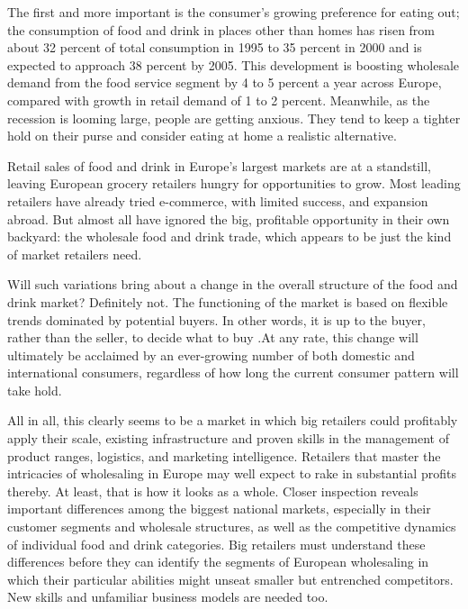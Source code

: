 
\qquad [A] The first and more important is the consumer's growing preference for eating out; the consumption of food and drink in places other than homes has risen from about 32 percent of total consumption in 1995 to 35 percent in 2000 and is expected to approach 38 percent by 2005. This development is boosting wholesale demand from the food service segment by 4 to 5 percent a year across Europe, compared with growth in retail demand of 1 to 2 percent. Meanwhile, as the recession is looming large, people are getting anxious. They tend to keep a tighter hold on their purse and consider eating at home a realistic alternative.

\qquad [B] Retail sales of food and drink in Europe's largest markets are at a standstill, leaving European grocery retailers hungry for opportunities to grow. Most leading retailers have already tried e-commerce, with limited success, and expansion abroad. But almost all have ignored the big, profitable opportunity in their own backyard: the wholesale food and drink trade, which appears to be just the kind of market retailers need.

\qquad [C] Will such variations bring about a change in the overall structure of the food and drink market? Definitely not. The functioning of the market is based on flexible trends dominated by potential buyers. In other words, it is up to the buyer, rather than the seller, to decide what to buy .At any rate, this change will ultimately be acclaimed by an ever-growing number of both domestic and international consumers, regardless of how long the current consumer pattern will take hold.

\qquad [D] All in all, this clearly seems to be a market in which big retailers could profitably apply their scale, existing infrastructure and proven skills in the management of product ranges, logistics, and marketing intelligence. Retailers that master the intricacies of wholesaling in Europe may well expect to rake in substantial profits thereby. At least, that is how it looks as a whole. Closer inspection reveals important differences among the biggest national markets, especially in their customer segments and wholesale structures, as well as the competitive dynamics of individual food and drink categories. Big retailers must understand these differences before they can identify the segments of European wholesaling in which their particular abilities might unseat smaller but entrenched competitors. New skills and unfamiliar business models are needed too.

